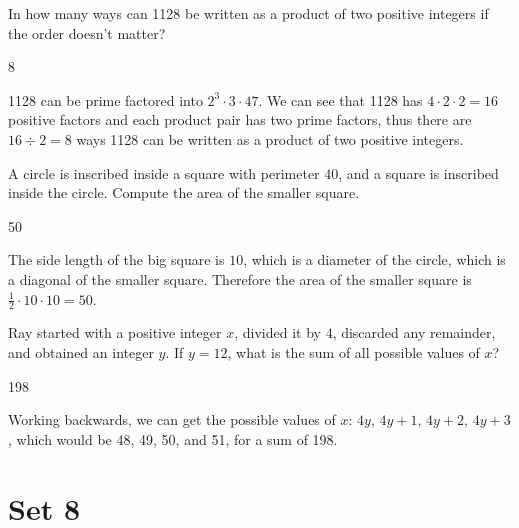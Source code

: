 \documentclass[11pt]{article}
\begin{document}
\begin{problem} %
In how many ways can 1128 be written as a product of two positive integers if the order doesn't matter?
\end{problem}

\begin{answer}
8
\end{answer}

\begin{solution}
1128 can be prime factored into $2^3 \cdot 3 \cdot 47$. We can see that 1128 has $4 \cdot 2 \cdot 2 = 16$ positive factors and each product pair has two prime factors, thus there are $16 \div 2 = 8$ ways 1128 can be written as a product of two positive integers.   
\end{solution}

\begin{problem} 
A circle is inscribed inside a square with perimeter $40$, and a square is inscribed inside the circle. Compute the area of the smaller square. 
\end{problem}

\begin{answer}
50
\end{answer}

\begin{solution}
The side length of the big square is $10$, which is a diameter of the circle, which is a diagonal of the smaller square. Therefore the area of the smaller square is $\frac{1}{2} \cdot 10 \cdot 10 = 50$.
\end{solution}

\begin{problem} 
Ray started with a positive integer $x$, divided it by $4$, discarded any remainder, and obtained an integer $y$. If $y = 12$, what is the sum of all possible values of $x$?
\end{problem}

\begin{answer}
198
\end{answer}

\begin{solution}
Working backwards, we can get the possible values of $x$: $4y$, $4y+1$, $4y+2$, $4y+3$, which would be 48, 49, 50, and 51, for a sum of 198.
\end{solution}

\newpage

\section*{Set 8}
\end{document}
